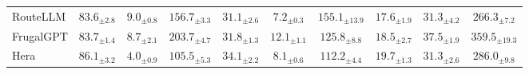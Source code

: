 \documentclass{article}
\newcommand{\name}{Hera\xspace}
\begin{document}
\begin{table}[t]
\begin{tabular}{l ccc | ccc | ccc}
RouteLLM & $83.6_{\pm 2.8}$ & $9.0_{\pm 0.8}$ & $156.7_{\pm 3.3}$
         & $31.1_{\pm 2.6}$ & $7.2_{\pm 0.3}$ & $155.1_{\pm 13.9}$ 
         & $17.6_{\pm 1.9}$ & $31.3_{\pm 4.2}$ & $266.3_{\pm 7.2}$ \\
FrugalGPT & $83.7_{\pm 1.4}$ & $8.7_{\pm 2.1}$ & $203.7_{\pm 4.7}$ 
         & $31.8_{\pm 1.3}$ & $12.1_{\pm 1.1}$ & $125.8_{\pm 8.8}$
         & $18.5_{\pm 2.7}$ & $37.5_{\pm 1.9}$ & $359.5_{\pm 19.3}$ \\
\cellcolor{blue!10}\name& \cellcolor{blue!10}$86.1_{\pm 3.2}$ & \cellcolor{blue!10}$4.0_{\pm 0.9}$ & \cellcolor{blue!10}$105.5_{\pm 5.3}$ 
         & \cellcolor{blue!10}$34.1_{\pm 2.2}$  & \cellcolor{blue!10}$8.1_{\pm 0.6}$ & \cellcolor{blue!10}$112.2_{\pm 4.4}$ 
         & \cellcolor{blue!10}$19.7_{\pm 1.3}$ & \cellcolor{blue!10}$31.3_{\pm 2.6}$ & \cellcolor{blue!10}$286.0_{\pm 9.8}$ \\
\bottomrule
\end{tabular}
\label{table:overall_text}
\vspace{-1em}  %
\end{table}
\end{document}
